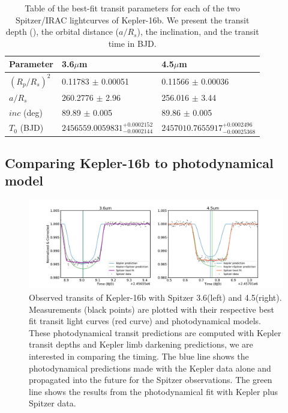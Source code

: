 \begin{table}
    \caption{Table of the best-fit transit parameters for each of the two Spitzer/IRAC lightcurves of Kepler-16b. We present the transit depth (\rprss), the orbital distance ($a/R_s$), the inclination, and the transit time in BJD.}

    \centering
    \begin{tabular}{lll}
    \hline \hline
    Parameter & 3.6$\mu$m & 4.5$\mu$m \\
    \hline
    $(R_p/R_s)^2$ &  0.11783 $\pm$ 0.00051 & 0.11566 $\pm$ 0.00036 \\
    $a/R_s$ & 260.2776 $\pm$ 2.96 & 256.016 $\pm$ 3.44   \\
    $inc$ (deg)  & 89.89 $\pm$ 0.005 & 89.86 $\pm$ 0.005 \\
    $T_0$ (BJD) &  $2456559.0059831^{+0.0002152}_{-0.0002144}$ &  $2457010.7655917^{+0.0002496}_{-0.00025368}$ \\
    \hline
    \end{tabular}
    \label{P4:tab:spitzerresults}
\end{table}

\subsection{Comparing Kepler-16b to photodynamical model}


\begin{figure}
    \centering
    \includegraphics[trim={3cm 0 3cm 0},clip, width=\linewidth]{Kepler16b_bestfit+pred+data.pdf}
    \caption{Observed transits of Kepler-16b with Spitzer 3.6\um (left) and 4.5\um (right). Measurements (black points) are plotted with their respective best fit transit light curves (red curve) and photodynamical models. These photodynamical transit predictions are computed with Kepler transit depths and Kepler limb darkening predictions, we are interested in comparing the timing. The blue line shows the photodynamical predictions made with the Kepler data alone and propagated into the future for the Spitzer observations. The green line shows the results from the photodynamical fit with Kepler plus Spitzer data. }
    \label{P4:fig:K16_photo}
\end{figure}

